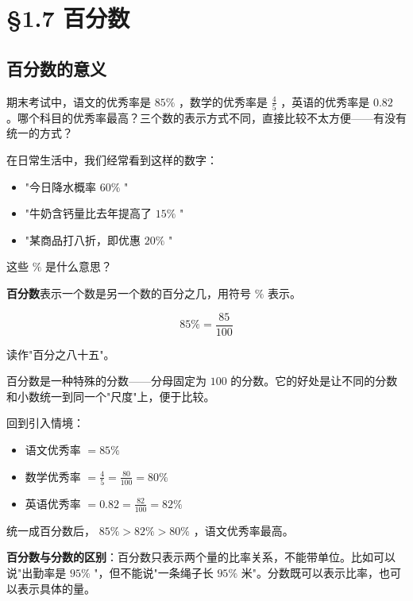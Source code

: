\chapter{§1.7 百分数}
\label{sec:1.7}





\section*{百分数的意义}


\begin{explore}


期末考试中，语文的优秀率是 $85\%$ ，数学的优秀率是 $\frac{4}{5}$ ，英语的优秀率是 $0.82$ 。哪个科目的优秀率最高？三个数的表示方式不同，直接比较不太方便——有没有统一的方式？

在日常生活中，我们经常看到这样的数字：

\begin{itemize}
  \item "今日降水概率 $60\%$ "
  \item "牛奶含钙量比去年提高了 $15\%$ "
  \item "某商品打八折，即优惠 $20\%$ "
\end{itemize}


这些 $\%$ 是什么意思？

\end{explore}

\begin{understand}


\textbf{百分数}表示一个数是另一个数的百分之几，用符号 $\%$ 表示。

\[
85\% = \frac{85}{100}
\]


读作"百分之八十五"。

百分数是一种特殊的分数——分母固定为 $100$ 的分数。它的好处是让不同的分数和小数统一到同一个"尺度"上，便于比较。

回到引入情境：
\begin{itemize}
  \item 语文优秀率 $= 85\%$
  \item 数学优秀率 $= \frac{4}{5} = \frac{80}{100} = 80\%$
  \item 英语优秀率 $= 0.82 = \frac{82}{100} = 82\%$
\end{itemize}


统一成百分数后， $85\% > 82\% > 80\%$ ，语文优秀率最高。

\textbf{百分数与分数的区别}：百分数只表示两个量的比率关系，不能带单位。比如可以说"出勤率是 $95\%$ "，但不能说"一条绳子长 $95\%$ 米"。分数既可以表示比率，也可以表示具体的量。

\end{understand}

